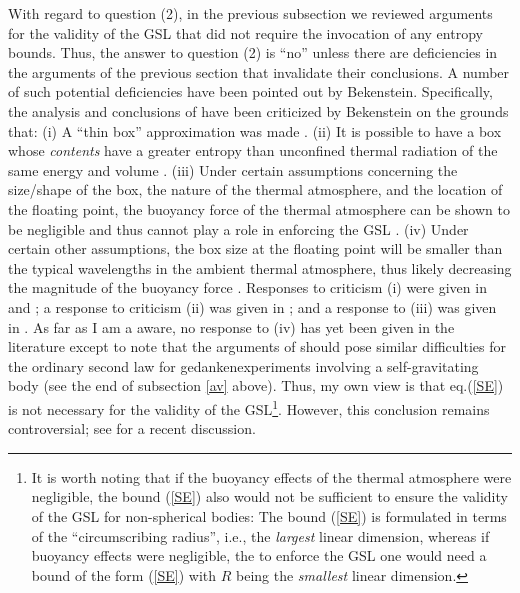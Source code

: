 With regard to question (2), in the previous subsection we reviewed
arguments for the validity of the GSL that did not require the
invocation of any entropy bounds. Thus, the answer to question (2) is
``no'' unless there are deficiencies in the arguments of the previous
section that invalidate their conclusions. A number of such potential
deficiencies have been pointed out by Bekenstein. Specifically, the
analysis and conclusions of \cite{uw} have been criticized by
Bekenstein on the grounds that: (i) A ``thin box'' approximation was
made \cite{b5}. (ii) It is possible to have a box whose {\it contents}
have a greater entropy than unconfined thermal radiation of the same
energy and volume \cite{b5}. (iii) Under certain assumptions
concerning the size/shape of the box, the nature of the thermal
atmosphere, and the location of the floating point, the buoyancy force
of the thermal atmosphere can be shown to be negligible and thus
cannot play a role in enforcing the GSL \cite{b6}. (iv) Under certain
other assumptions, the box size at the floating point will be smaller
than the typical wavelengths in the ambient thermal atmosphere, thus
likely decreasing the magnitude of the buoyancy force \cite{b7}.
Responses to criticism (i) were given in \cite{uw2} and \cite{pw}; a
response to criticism (ii) was given in \cite{uw2}; and
a response to (iii) was given in \cite{pw}. As far as I am a aware, no
response to (iv) has yet been given in the literature except to note
\cite{fmw} that the arguments of \cite{b7} should pose similar
difficulties for the ordinary second law for gedankenexperiments
involving a self-gravitating body (see the end of
subsection \ref{av} above). Thus, my own view is that eq.(\ref{SE})
is not necessary for the validity of the GSL\footnote{It is worth
noting that if the buoyancy effects of the thermal atmosphere were
negligible, the bound (\ref{SE}) also would not be sufficient to
ensure the validity of the GSL for non-spherical bodies: The bound
(\ref{SE}) is formulated in terms of the ``circumscribing radius'',
i.e., the {\it largest} linear dimension, whereas if buoyancy effects
were negligible, the to enforce the GSL one would need a bound of the
form (\ref{SE}) with $R$ being the {\it smallest} linear
dimension.}. However, this conclusion remains controversial; see
\cite{and} for a recent discussion.

